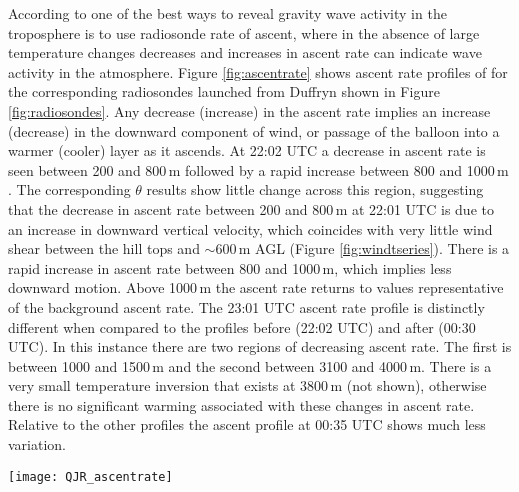 \documentclass[times]{qjrms4}
\begin{document}
According to \citet{lalas1980tropospheric} one of the best ways to reveal gravity wave activity in the troposphere is to use radiosonde rate of ascent, where in the absence of large temperature changes decreases and increases in ascent rate can indicate wave activity in the atmosphere. Figure \ref{fig:ascentrate} shows ascent rate profiles of for the corresponding radiosondes launched from Duffryn shown in Figure \ref{fig:radiosondes}. Any decrease (increase) in the ascent rate implies an increase (decrease) in the downward component of wind, or passage of the balloon into a warmer (cooler) layer as it ascends. At 22:02 UTC a decrease in ascent rate is seen between 200 and 800$\,\mbox{m}$ followed by a rapid increase between 800 and 1000$\,\mbox{m}$. The corresponding $\theta$ results show little change across this region, suggesting that the decrease in ascent rate between 200 and 800$\,\mbox{m}$ at 22:01 UTC is due to an increase in downward vertical velocity, which  coincides with very little wind shear between the hill tops and $\sim$600$\,\mbox{m}$ AGL (Figure \ref{fig:windtseries}). There is a rapid increase in ascent rate between 800 and 1000$\,\mbox{m}$, which implies less downward motion. Above 1000$\,\mbox{m}$ the ascent rate returns to values representative of the background ascent rate. The 23:01 UTC ascent rate profile is distinctly different when compared to the profiles before (22:02 UTC) and after (00:30 UTC). In this instance there are two regions of decreasing ascent rate. The first is between 1000 and 1500$\,\mbox{m}$ and the second between 3100 and 4000$\,\mbox{m}$. There is a very small temperature inversion that exists at 3800$\,\mbox{m}$ (not shown), otherwise there is no significant warming associated with these changes in ascent rate. Relative to the other profiles the ascent profile at 00:35 UTC shows much less variation.
%
       \begin{figure*}
        \centering
        \texttt{[image: QJR\_ascentrate]}
        \caption{Radiosonde rate of ascent for profiles launched from Duffryn at 22:02, 23:01 and 00:30 UTC.}
        \label{fig:ascentrate}
        \end{figure*}
\end{document}
